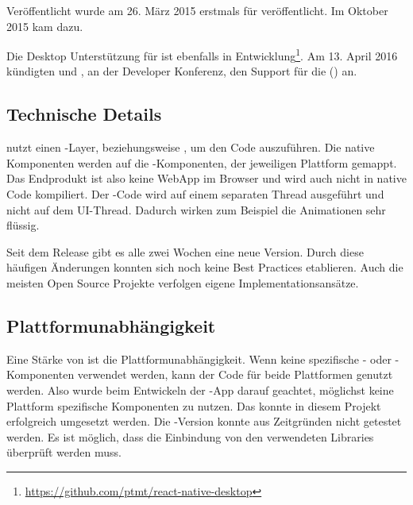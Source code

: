 Veröffentlicht wurde  am 26. März 2015 erstmals für  veröffentlicht.
Im Oktober 2015 kam  dazu.\cite{react-native-release}

Die Desktop Unterstützung für  ist ebenfalls in Entwicklung\footnote{\url{https://github.com/ptmt/react-native-desktop}}. 
Am 13. April 2016 kündigten  und , an der  Developer Konferenz, den Support für die  () an.\cite{react-native-windows} 


\subsection{Technische Details}
 nutzt einen -Layer, beziehungsweise , um den Code auszuführen.\cite{react-native-javascriptcore} 
Die native Komponenten werden auf die -Komponenten, der jeweiligen Plattform gemappt. 
Das Endprodukt ist also keine \gls{WebApp} im Browser und wird auch nicht in native Code kompiliert. 
Der -Code wird auf einem separaten Thread ausgeführt und nicht auf dem UI-Thread. 
Dadurch wirken zum Beispiel die Animationen sehr flüssig.\cite{react-native-javascript-thread}



Seit dem Release gibt es alle zwei Wochen eine neue Version. 
Durch diese häufigen Änderungen konnten sich noch keine Best Practices etablieren. 
Auch die meisten Open Source Projekte verfolgen eigene Implementationsansätze.


\subsection{Plattformunabhängigkeit}
Eine Stärke von  ist die Plattformunabhängigkeit. 
Wenn keine spezifische - oder -Komponenten verwendet werden, kann der Code für beide Plattformen genutzt werden.
Also wurde beim Entwickeln der -App darauf geachtet, möglichst keine Plattform spezifische Komponenten zu nutzen. 
Das konnte in diesem Projekt erfolgreich umgesetzt werden. 
Die -Version konnte aus Zeitgründen nicht getestet werden. 
Es ist möglich, dass die Einbindung von den verwendeten Libraries überprüft werden muss. 


